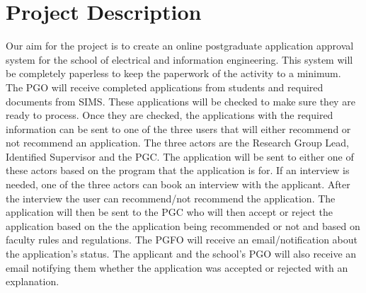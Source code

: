 \documentclass{article}
\begin{document}
\section*{Project Description}
Our aim for the project is to create an online postgraduate application approval system for
the school of electrical and information engineering. This system will be completely
paperless to keep the paperwork of the activity to a minimum. \\
The PGO will receive completed applications from students and required documents from
SIMS. These applications will be checked to make sure they are ready to process. Once they
are checked, the applications with the required information can be sent to one of the three
users that will either recommend or not recommend an application. The three actors are
the Research Group Lead, Identified Supervisor and the PGC. The application will be sent to
either one of these actors based on the program that the application is for. If an interview is
needed, one of the three actors can book an interview with the applicant. After the
interview the user can recommend/not recommend the application. The application will
then be sent to the PGC who will then accept or reject the application based on the the
application being recommended or not and based on faculty rules and regulations. The
PGFO will receive an email/notification about the application's status. The applicant and the
school’s PGO will also receive an email notifying them whether the application was accepted
or rejected with an explanation.
\end{document}
